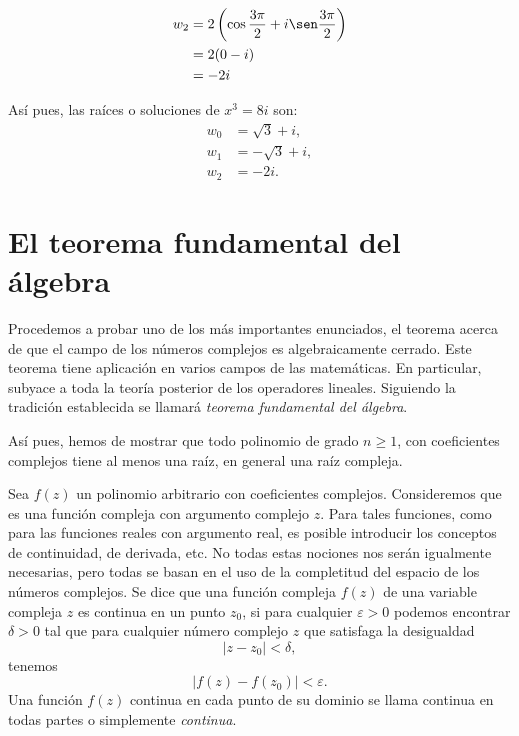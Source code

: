 \begin{example}
\begin{itemize}
        $$ \begin{aligned} w_2 &=2\left(\cos \frac{3 \pi}{2}+i \sen \frac{3 \pi}{2}\right) \\ &=2(0-i) \\ &=-2 i \end{aligned} $$
    \end{itemize}
    Así pues, las raíces o soluciones de $x^3=8 i$ son:
    \begin{align*}
        w_0 &=\sqrt{3}+i, \\
        w_1 &=-\sqrt{3}+i, \\
        w_2 &=-2 i.
    \end{align*}
\end{example}

\section{El teorema fundamental del álgebra}

Procedemos a probar uno de los más importantes enunciados, el teorema acerca de que el campo de los números complejos es algebraicamente cerrado. Este teorema tiene aplicación en varios campos de las matemáticas. En particular, subyace a toda la teoría posterior de los operadores lineales. Siguiendo la tradición establecida se llamará \textit{teorema fundamental del álgebra}.

Así pues, hemos de mostrar que todo polinomio de grado $n \geq 1$, con coeficientes complejos tiene al menos una raíz, en general una raíz compleja.

Sea $f(z)$ un polinomio arbitrario con coeficientes complejos. Consideremos que es una función compleja con argumento complejo $z$. Para tales funciones, como para las funciones reales con argumento real, es posible introducir los conceptos de continuidad, de derivada, etc. No todas estas nociones nos serán igualmente necesarias, pero todas se basan en el uso de la completitud del espacio de los números complejos. Se dice que una función compleja $f(z)$ de una variable compleja $z$ es continua en un punto $z_0$, si para cualquier $\varepsilon >0$ podemos encontrar $\delta >0$ tal que para cualquier número complejo $z$ que satisfaga la desigualdad
$$|z-z_0| < \delta,$$
tenemos
$$|f(z)-f(z_0)| < \varepsilon.$$
Una función $f(z)$ continua en cada punto de su dominio se llama continua en todas partes o simplemente \textit{continua}.

